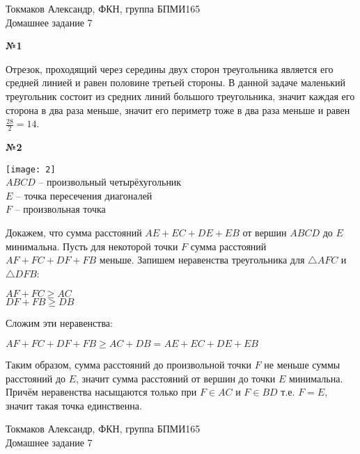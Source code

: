 \documentclass{article}
\newenvironment{task}{\begin{center}\fontsize{14}{14}\selectfont\bf}{\rm\fontsize{12}{12}\selectfont\end{center}}
\begin{document}
	\begin{center}
		Токмаков Александр, ФКН, группа БПМИ165 \\
		Домашнее задание 7
	\end{center}
	
	\begin{task} 
		№1
	\end{task}
	Отрезок, проходящий через середины двух сторон треугольника является его средней линией и равен половине третьей стороны. В данной задаче маленький треугольник состоит из средних линий большого треугольника, значит каждая его сторона в два раза меньше, значит его периметр тоже в два раза меньше и равен $\frac{28}{2} = 14$.



	\begin{task} 
		№2
	\end{task}
	\begin{center}
		\texttt{[image: 2]}\\
		$ABCD$ -- произвольный четырёхугольник \\
		$E$ -- точка пересечения диагоналей \\
		$F$ -- произвольная точка
	\end{center}
	Докажем, что сумма расстояний $AE + EC + DE + EB$ от вершин $ABCD$ до $E$ минимальна. Пусть для некоторой точки $F$ сумма расстояний $AF + FC + DF + FB$ меньше. Запишем неравенства треугольника для $\triangle AFC$ и $\triangle DFB$: 
	\begin{center}
		$AF + FC \geq AC$ \\
		$DF + FB \geq DB$
	\end{center}
	Сложим эти неравенства:
	\begin{center}
		$AF + FC + DF + FB \geq AC + DB = AE + EC + DE + EB$ 
	\end{center}
	Таким образом, сумма расстояний до произвольной точки $F$ не меньше суммы расстояний до $E$, значит сумма расстояний от вершин до точки $E$ минимальна. Причём неравенства насыщаются только при $F \in AC$ и $F \in BD$ т.е. $F=E$, значит такая точка единственна. 
	
	
	\newpage
	\begin{center}
		Токмаков Александр, ФКН, группа БПМИ165 \\
		Домашнее задание 7
	\end{center}
	
\end{document}
